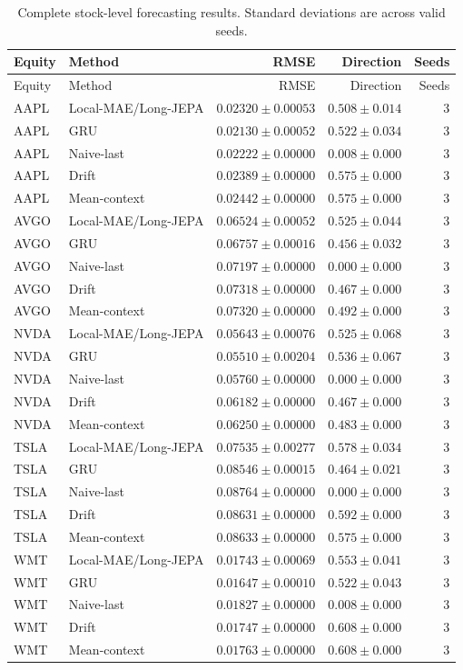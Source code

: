 \begin{longtable}{llrrr}
\caption{Complete stock-level forecasting results. Standard deviations are across valid seeds.}\label{tab:appendix_stock_metrics}\\
\toprule
Equity & Method & RMSE & Direction & Seeds \\
\midrule
\endfirsthead
\toprule
Equity & Method & RMSE & Direction & Seeds \\
\midrule
\endhead
AAPL & Local-MAE/Long-JEPA & $0.02320 \pm 0.00053$ & $0.508 \pm 0.014$ & 3 \\
AAPL & GRU & $0.02130 \pm 0.00052$ & $0.522 \pm 0.034$ & 3 \\
AAPL & Naive-last & $0.02222 \pm 0.00000$ & $0.008 \pm 0.000$ & 3 \\
AAPL & Drift & $0.02389 \pm 0.00000$ & $0.575 \pm 0.000$ & 3 \\
AAPL & Mean-context & $0.02442 \pm 0.00000$ & $0.575 \pm 0.000$ & 3 \\
AVGO & Local-MAE/Long-JEPA & $0.06524 \pm 0.00052$ & $0.525 \pm 0.044$ & 3 \\
AVGO & GRU & $0.06757 \pm 0.00016$ & $0.456 \pm 0.032$ & 3 \\
AVGO & Naive-last & $0.07197 \pm 0.00000$ & $0.000 \pm 0.000$ & 3 \\
AVGO & Drift & $0.07318 \pm 0.00000$ & $0.467 \pm 0.000$ & 3 \\
AVGO & Mean-context & $0.07320 \pm 0.00000$ & $0.492 \pm 0.000$ & 3 \\
NVDA & Local-MAE/Long-JEPA & $0.05643 \pm 0.00076$ & $0.525 \pm 0.068$ & 3 \\
NVDA & GRU & $0.05510 \pm 0.00204$ & $0.536 \pm 0.067$ & 3 \\
NVDA & Naive-last & $0.05760 \pm 0.00000$ & $0.000 \pm 0.000$ & 3 \\
NVDA & Drift & $0.06182 \pm 0.00000$ & $0.467 \pm 0.000$ & 3 \\
NVDA & Mean-context & $0.06250 \pm 0.00000$ & $0.483 \pm 0.000$ & 3 \\
TSLA & Local-MAE/Long-JEPA & $0.07535 \pm 0.00277$ & $0.578 \pm 0.034$ & 3 \\
TSLA & GRU & $0.08546 \pm 0.00015$ & $0.464 \pm 0.021$ & 3 \\
TSLA & Naive-last & $0.08764 \pm 0.00000$ & $0.000 \pm 0.000$ & 3 \\
TSLA & Drift & $0.08631 \pm 0.00000$ & $0.592 \pm 0.000$ & 3 \\
TSLA & Mean-context & $0.08633 \pm 0.00000$ & $0.575 \pm 0.000$ & 3 \\
WMT & Local-MAE/Long-JEPA & $0.01743 \pm 0.00069$ & $0.553 \pm 0.041$ & 3 \\
WMT & GRU & $0.01647 \pm 0.00010$ & $0.522 \pm 0.043$ & 3 \\
WMT & Naive-last & $0.01827 \pm 0.00000$ & $0.008 \pm 0.000$ & 3 \\
WMT & Drift & $0.01747 \pm 0.00000$ & $0.608 \pm 0.000$ & 3 \\
WMT & Mean-context & $0.01763 \pm 0.00000$ & $0.608 \pm 0.000$ & 3 \\
\bottomrule
\end{longtable}
